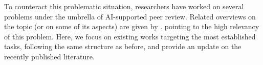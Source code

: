 To counteract this problematic situation, researchers have worked on several problems under the umbrella of AI-supported peer review. Related overviews on the topic (or on some of its aspects) are given by \cite{kousha,drori2024human,staudinger-etal-2024-analysis,lin2023automated,checco,kuznetsov2024can}.  %
pointing to the high relevancy of this problem. %
Here, we focus on existing works targeting the most established tasks, following the same structure as before, and provide an update on the recently published literature.

